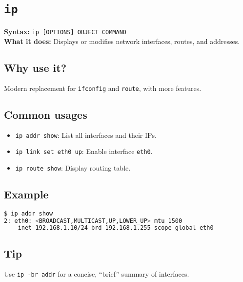 \documentclass[10pt,oneside]{scrbook}
\begin{document}
\section{\texttt{ip}}
\begin{cmdbox}
  \textbf{Syntax:} \lstinline!ip [OPTIONS] OBJECT COMMAND! \\
  \textbf{What it does:} Displays or modifies network interfaces, routes, and addresses.
\end{cmdbox}
\begin{commanddetails}
  \subsection*{Why use it?}
    Modern replacement for \texttt{ifconfig} and \texttt{route}, with more features.

  \subsection*{Common usages}
    \begin{itemize}
      \item \lstinline!ip addr show!: List all interfaces and their IPs.
      \item \lstinline!ip link set eth0 up!: Enable interface \texttt{eth0}.
      \item \lstinline!ip route show!: Display routing table.
    \end{itemize}

  \subsection*{Example}
  \begin{lstlisting}[language=bash]
$ ip addr show
2: eth0: <BROADCAST,MULTICAST,UP,LOWER_UP> mtu 1500
    inet 192.168.1.10/24 brd 192.168.1.255 scope global eth0
  \end{lstlisting}

  \subsection*{Tip}
    Use \lstinline!ip -br addr! for a concise, “brief” summary of interfaces.
\end{commanddetails}

\end{document}
